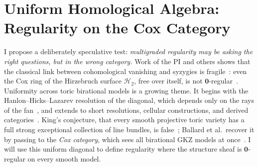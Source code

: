 \documentclass[11pt,reqno]{amsart}
\theoremstyle{remark}
\newcommand{\zero}{\mathbf{0}}
\newcommand{\cH}{\mathcal{H}}
\begin{document}
\section{Uniform Homological Algebra: Regularity on the Cox Category}
\label{sec:uniform-homological-algebra-on-toric}

%

I propose a deliberately speculative test: \emph{multigraded regularity may be asking the right questions, but in the wrong category.} Work of the PI and others shows that the classical link between cohomological vanishing and syzygies is fragile~\cite{maclaganSmith04,bruceHellerSayrafi26,bruceHellerSayrafi22}: even the Cox ring of the Hirzebruch surface $\cH_2$, free over itself, is not $\zero$-regular~\cite[Ex.~4.3]{maclaganSmith04}. Uniformity across toric birational models is a growing theme. It begins with the Hanlon--Hicks--Lazarev resolution of the diagonal, which depends only on the rays of the fan~\cite{HHL24}, and extends to short resolutions, cellular constructions, and derived categories~\cite{brownErman24-1,faveroHuang23,faveroHuang25,faveroSapronov24,CH25,borisovHan25,berkeschHellerSmithYang25,han26,EHLZ25}. King's conjecture, that every smooth projective toric variety has a full strong exceptional collection of line bundles, is false~\cite{hillePerling06,mateusz11}; Ballard et al.\ recover it by passing to the \emph{Cox category}, which sees all birational GKZ models at once~\cite{longLiveKing}. I will use this uniform diagonal to define regularity where the structure sheaf is $\zero$-regular on every smooth model.
\end{document}
